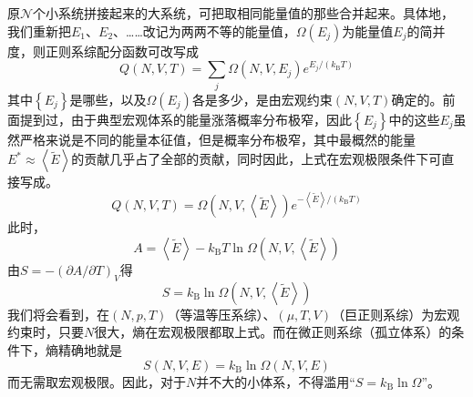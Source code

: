 \documentclass[main.tex]{subfiles}
\begin{document}
原$\mathcal{N}$个小系统拼接起来的大系统，可把取相同能量值的那些合并起来。具体地，我们重新把$E_1$、$E_2$、……改记为两两不等的能量值，$\Omega\left(E_j\right)$为能量值$E_j$的简并度，则正则系综配分函数可改写成
\[Q\left(N,V,T\right)=\sum_{j}\Omega\left(N,V,E_j\right)e^{E_j/\left(k_\text{B}T\right)}\]
其中$\left\{E_j\right\}$是哪些，以及$\Omega\left(E_j\right)$各是多少，是由宏观约束$\left(N,V,T\right)$确定的。前面提到过，由于典型宏观体系的能量涨落概率分布极窄，因此$\left\{E_j\right\}$中的这些$E_j$虽然严格来说是不同的能量本征值，但是概率分布极窄，其中最概然的能量$E^*\approx \left\langle\tilde{E}\right\rangle$的贡献几乎占了全部的贡献，同时因此，上式在宏观极限条件下可直接写成。
\[Q\left(N,V,T\right)=\Omega\left(N,V,\left\langle\tilde{E}\right\rangle\right)e^{-\left\langle\tilde{E}\right\rangle/\left(k_\text{B}T\right)}\]
此时，
\[A=\left\langle\tilde{E}\right\rangle-k_\text{B}T\ln\Omega\left(N,V,\left\langle\tilde{E}\right\rangle\right)\]
由$S=-\left(\partial A/\partial T\right)_{V}$得
\[S=k_\text{B}\ln\Omega\left(N,V,\left\langle\tilde{E}\right\rangle\right)\]
我们将会看到，在$\left(N,p,T\right)$（等温等压系综）、$\left(\mu,T,V\right)$（巨正则系综）为宏观约束时，只要$N$很大，熵在宏观极限都取上式。而在微正则系综（孤立体系）的条件下，熵精确地就是
\[S\left(N,V,E\right)=k_\text{B}\ln\Omega\left(N,V,E\right)\]
而无需取宏观极限。因此，对于$N$并不大的小体系，不得滥用“$S=k_\text{B}\ln\Omega$”。
\end{document}
